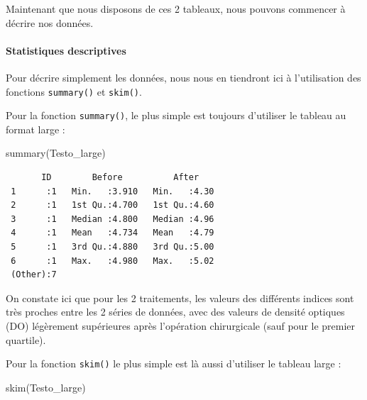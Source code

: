 \documentclass[
  a4paper,
]{article}
\newenvironment{Shaded}{\begin{snugshade}}{\end{snugshade}}
\newcommand{\FunctionTok}[1]{\textcolor[rgb]{0.39,0.29,0.61}{#1}}
\newcommand{\NormalTok}[1]{\textcolor[rgb]{0.12,0.11,0.11}{#1}}
\begin{document}
Maintenant que nous disposons de ces 2 tableaux, nous pouvons commencer à décrire nos données.

\hypertarget{statistiques-descriptives-1}{%
\paragraph{Statistiques descriptives}\label{statistiques-descriptives-1}}

Pour décrire simplement les données, nous nous en tiendront ici à l'utilisation des fonctions \texttt{summary()} et \texttt{skim()}.

Pour la fonction \texttt{summary()}, le plus simple est toujours d'utiliser le tableau au format large :

\begin{Shaded}
\begin{Highlighting}[]
\FunctionTok{summary}\NormalTok{(Testo\_large)}
\end{Highlighting}
\end{Shaded}

\begin{verbatim}
       ID        Before          After     
 1      :1   Min.   :3.910   Min.   :4.30  
 2      :1   1st Qu.:4.700   1st Qu.:4.60  
 3      :1   Median :4.800   Median :4.96  
 4      :1   Mean   :4.734   Mean   :4.79  
 5      :1   3rd Qu.:4.880   3rd Qu.:5.00  
 6      :1   Max.   :4.980   Max.   :5.02  
 (Other):7                                 
\end{verbatim}

On constate ici que pour les 2 traitements, les valeurs des différents indices sont très proches entre les 2 séries de données, avec des valeurs de densité optiques (DO) légèrement supérieures après l'opération chirurgicale (sauf pour le premier quartile).

Pour la fonction \texttt{skim()} le plus simple est là aussi d'utiliser le tableau large :

\begin{Shaded}
\begin{Highlighting}[]
\FunctionTok{skim}\NormalTok{(Testo\_large)}
\end{Highlighting}
\end{Shaded}
\end{document}
